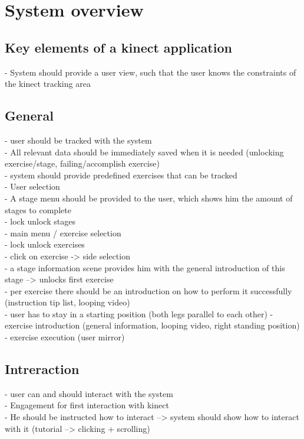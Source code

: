 \section{System overview}\label{4_1_requirements}
\subsection{Key elements of a kinect application}
- System should provide a user view, such that the user knows the constraints of the kinect tracking area

\subsection{General}
- user should be tracked with the system
\\- All relevant data should be immediately saved when it is needed (unlocking exercise/stage, failing/accomplish exercise)
\\- system should provide predefined exercises that can be tracked
\\- User selection
\\- A stage menu should be provided to the user, which shows him the amount of stages to complete
\\- lock unlock stages
\\- main menu / exercise selection
\\- lock unlock exercises
\\- click on exercise -> side selection
\\- a stage information scene provides him with the general introduction of this stage --> unlocks first exercise
\\- per exercise there should be an introduction on how to perform it successfully (instruction tip list, looping video)
\\- user has to stay in a starting position (both legs parallel to each other)
- exercise introduction (general information, looping video, right standing position)
- exercise execution (user mirror)

\subsection{Intreraction}
- user can and should interact with the system
\\- Engagement for first interaction with kinect
\\- He should be instructed how to interact --> system should show how to interact with it (tutorial --> clicking + scrolling)

